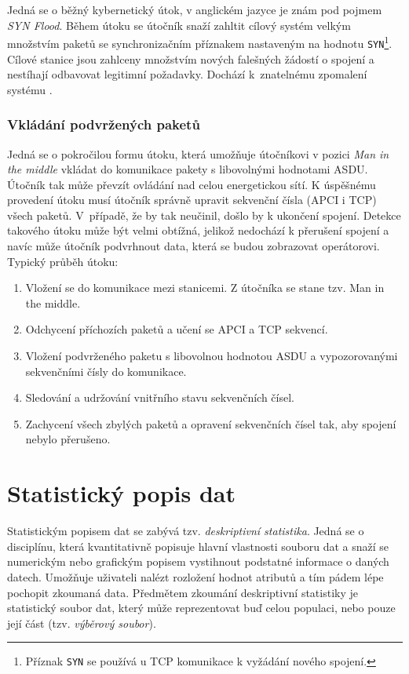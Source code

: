 Jedná se o běžný kybernetický útok, v anglickém jazyce je znám pod pojmem \emph{SYN Flood}. Během útoku se útočník snaží zahltit cílový systém velkým množstvím paketů se synchronizačním příznakem nastaveným na hodnotu \texttt{SYN}\footnote{Příznak \texttt{SYN} se používá u TCP komunikace k vyžádání nového spojení.}. Cílové stanice jsou zahlceny množstvím nových falešných žádostí o spojení a nestíhají odbavovat legitimní požadavky. Dochází k~znatelnému zpomalení systému \cite{radoglou}.



\subsection*{Vkládání podvržených paketů}

Jedná se o pokročilou formu útoku, která umožňuje útočníkovi v pozici \emph{Man in the middle} vkládat do komunikace pakety s libovolnými hodnotami ASDU. Útočník tak může převzít ovládání nad celou energetickou sítí. K úspěšnému provedení útoku musí útočník správně upravit sekvenční čísla (APCI i TCP) všech paketů. V~případě, že by tak neučinil, došlo by k ukončení spojení. Detekce takového útoku může být velmi obtížná, jelikož nedochází k přerušení spojení a navíc může útočník podvrhnout data, která se budou zobrazovat operátorovi. Typický průběh útoku:

\begin{enumerate}
    \item Vložení se do komunikace mezi stanicemi. Z útočníka se stane tzv. Man in the middle.
    \item Odchycení příchozích paketů a učení se APCI a TCP sekvencí.
    \item Vložení podvrženého paketu s libovolnou hodnotou ASDU a vypozorovanými sekvenčními čísly do komunikace.
    \item Sledování a udržování vnitřního stavu sekvenčních čísel.
    \item Zachycení všech zbylých paketů a opravení sekvenčních čísel tak, aby spojení nebylo přerušeno.
\end{enumerate}

\chapter{Statistický popis dat}
\label{chapter_stats}

Statistickým popisem dat se zabývá tzv. \emph{deskriptivní statistika}. Jedná se o disciplínu, která kvantitativně popisuje hlavní vlastnosti souboru dat a snaží se numerickým nebo grafickým popisem vystihnout podstatné informace o daných datech. Umožňuje uživateli nalézt rozložení hodnot atributů a tím pádem lépe pochopit zkoumaná data. Předmětem zkoumání deskriptivní statistiky je statistický soubor dat, který může reprezentovat buď celou populaci, nebo pouze její část (tzv. \emph{výběrový soubor}).

